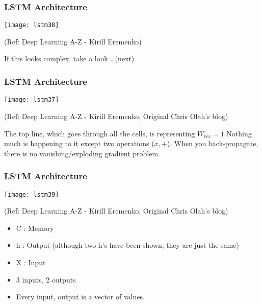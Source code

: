 \begin{frame}[fragile] \frametitle{LSTM Architecture}
\begin{center}
\texttt{[image: lstm38]}

\tiny{(Ref: Deep Learning A-Z - Kirill Eremenko)}
\end{center}

If this looks complex, take a look \ldots (next)

\end{frame}


\begin{frame}[fragile] \frametitle{LSTM Architecture}
\begin{center}
\texttt{[image: lstm37]}

\tiny{(Ref: Deep Learning A-Z - Kirill Eremenko, Original Chris Olah's blog)}
\end{center}

The top line, which goes through all the cells, is representing $W_{rec} = 1$ Nothing much is happening to it except two operations ($x,+$).
When you back-propagate, there is no vanishing/exploding gradient problem.

\end{frame}

\begin{frame}[fragile] \frametitle{LSTM Architecture}
\begin{center}
\texttt{[image: lstm39]}

\tiny{(Ref: Deep Learning A-Z - Kirill Eremenko, Original Chris Olah's blog)}
\end{center}

\begin{itemize}
\item C : Memory
\item h : Output (although two h's have been shown, they are just the same)
\item X : Input
\item 3 inputs, 2 outputs
\item Every input, output is a vector of values.
\end{itemize}

\end{frame}




